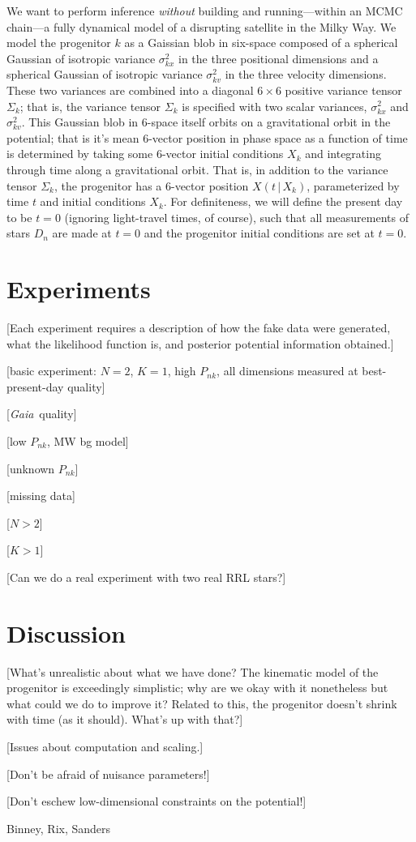 \documentclass[letterpaper,12pt,preprint]{aastex}
\newcommand{\project}[1]{\textsl{#1}}
\newcommand{\gaia}{\project{Gaia}}
\newcommand{\given}{\,|\,}
\begin{document}
We want to perform inference \emph{without} building and
running---within an MCMC chain---a fully dynamical model of a
disrupting satellite in the Milky Way.  We model the progenitor $k$ as
a Gaissian blob in six-space composed of a spherical Gaussian of
isotropic variance $\sigma_{kx}^2$ in the three positional dimensions
and a spherical Gaussian of isotropic variance $\sigma_{kv}^2$ in the
three velocity dimensions.  These two variances are combined into a
diagonal $6\times 6$ positive variance tensor $\Sigma_k$; that is, the
variance tensor $\Sigma_k$ is specified with two scalar variances,
$\sigma_{kx}^2$ and $\sigma_{kv}^2$.  This Gaussian blob in 6-space
itself orbits on a gravitational orbit in the potential; that is it's
mean 6-vector position in phase space as a function of time is
determined by taking some 6-vector initial conditions $X_k$ and
integrating through time along a gravitational orbit.  That is, in
addition to the variance tensor $\Sigma_k$, the progenitor has a
6-vector position $X(t\given X_k)$, parameterized by time $t$ and
initial conditions $X_k$.  For definiteness, we will define the
present day to be $t=0$ (ignoring light-travel times, of course), such
that all measurements of stars $D_n$ are made at $t=0$ and the
progenitor initial conditions are set at $t=0$.

\section{Experiments}

[Each experiment requires a description of how the fake data were
  generated, what the likelihood function is, and posterior potential
  information obtained.]

[basic experiment: $N=2$, $K=1$, high $P_{nk}$, all dimensions
  measured at best-present-day quality]

[\gaia\ quality]

[low $P_{nk}$, MW bg model]

[unknown $P_{nk}$]

[missing data]

[$N>2$]

[$K>1$]

[Can we do a real experiment with two real RRL stars?]

\section{Discussion}

[What's unrealistic about what we have done?  The kinematic model of
  the progenitor is exceedingly simplistic; why are we okay with it
  nonetheless but what could we do to improve it?  Related to this,
  the progenitor doesn't shrink with time (as it should).  What's up
  with that?]

[Issues about computation and scaling.]

[Don't be afraid of nuisance parameters!]

[Don't eschew low-dimensional constraints on the potential!]

\acknowledgements
Binney, Rix, Sanders
\end{document}
